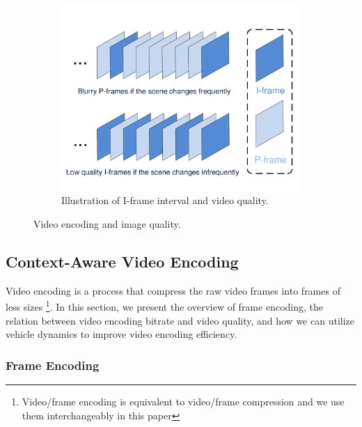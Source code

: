 \begin{figure}[ht]
\begin{subfigure}[t]{0.32\textwidth}
    \includegraphics[width=\linewidth]{Figs/RTDrive/intervals.pdf}
    \caption{Illustration of I-frame interval and video quality.}
    \label{interval}
  \end{subfigure}
\caption{Video encoding and image quality.}
\end{figure}


\subsection{Context-Aware Video Encoding}


Video encoding is a process that compress the raw video frames 
into frames of less sizes 
\footnote{Video/frame encoding is equivalent to video/frame compression 
and we use them interchangeably in this paper}.
In this section, we present the overview of frame encoding, 
the relation between video encoding bitrate and video
quality, and how we can utilize
vehicle dynamics to improve video encoding efficiency.  

\subsubsection{Frame Encoding}
\label{sec_frame_encoding}




